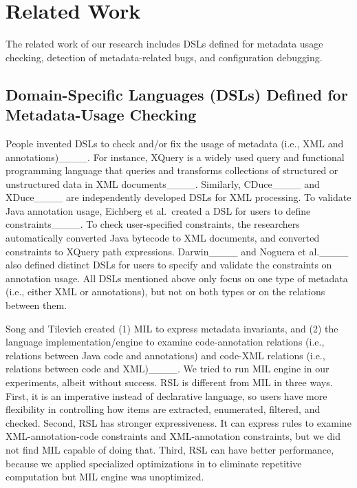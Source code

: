 \section{Related Work}
\label{se:related}
The related work of our research includes DSLs defined for metadata usage checking, detection of metadata-related bugs, and configuration debugging.

  \vspace{-.5em}
\subsection{Domain-Specific Languages (DSLs) Defined for Metadata-Usage Checking}

People invented DSLs to check and/or fix the usage of metadata (i.e., XML and annotations)____. For instance, XQuery is a widely used query and functional programming language that queries and transforms collections of structured or unstructured data in XML documents____. Similarly, CDuce____ and XDuce____ are independently developed DSLs for XML processing. 
To validate Java annotation usage, 
Eichberg et al.~created a DSL for users to define constraints____. To check user-specified constraints, the researchers automatically converted Java bytecode to XML documents, and converted constraints to XQuery path expressions.  Darwin____ and Noguera et al.____ also  defined distinct DSLs for users to specify and  validate the constraints on annotation usage. 
All DSLs mentioned above only focus on one type of metadata (i.e., either XML or annotations), but not on both types or on the relations between them. 



Song and Tilevich created (1) MIL to express metadata invariants, and (2) the language implementation/engine to 
examine code-annotation relations (i.e., relations between Java code and annotations) and code-XML relations (i.e., relations between code and XML)____. We tried to run MIL engine in our experiments, albeit without success. RSL is different from MIL in three ways. First, it is an imperative instead of declarative language, so users have more flexibility in controlling how items are extracted, enumerated, filtered, and checked. 
Second, RSL has stronger expressiveness. It can express rules to examine 
XML-annotation-code constraints and XML-annotation constraints, but we did not find MIL capable of doing that. Third, RSL can  have better performance, because we applied specialized optimizations in \tool to eliminate repetitive computation but MIL engine was unoptimized.

